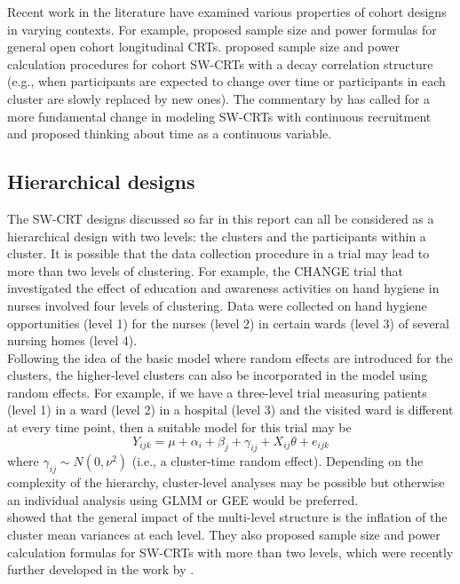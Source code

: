 \documentclass[10pt]{article}
\begin{document}
Recent work in the literature have examined various properties of cohort designs in varying contexts. For example, \textcite{Kasza:2020} proposed sample size and power formulas for general open cohort longitudinal CRTs. \textcite{Li:2020} proposed sample size and power calculation procedures for cohort SW-CRTs with a decay correlation structure (e.g., when participants are expected to change over time or participants in each cluster are slowly replaced by new ones). The commentary by \textcite{Hooper:2019} has called for a more fundamental change in modeling SW-CRTs with continuous recruitment and proposed thinking about time as a continuous variable.

\subsection{Hierarchical designs}

The SW-CRT designs discussed so far in this report can all be considered as a hierarchical design with two levels: the clusters and the participants within a cluster. It is possible that the data collection procedure in a trial may lead to more than two levels of clustering. For example, the CHANGE trial \parencite{Lescure:2021} that investigated the effect of education and awareness activities on hand hygiene in nurses involved four levels of clustering. Data were collected on hand hygiene opportunities (level 1) for the nurses (level 2) in certain wards (level 3) of several nursing homes (level 4).
\\

Following the idea of the basic model where random effects are introduced for the clusters, the higher-level clusters can also be incorporated in the model using random effects. For example, if we have a three-level trial measuring patients (level 1) in a ward (level 2) in a hospital (level 3) and the visited ward is different at every time point, then a suitable model for this trial may be
\[
Y_{ijk} = \mu + \alpha_i + \beta_j + \gamma_{ij} + X_{ij}\theta + e_{ijk}
\]
where $\gamma_{ij}\sim N(0,\nu^2)$ (i.e., a cluster-time random effect). Depending on the complexity of the hierarchy, cluster-level analyses may be possible but otherwise an individual analysis using GLMM or GEE would be preferred.
\\

\textcite{Teerenstra:2019} showed that the general impact of the multi-level structure is the inflation of the cluster mean variances at each level. They also proposed sample size and power calculation formulas for SW-CRTs with more than two levels, which were recently further developed in the work by \textcite{DavisPlourde:2021}.
\end{document}
